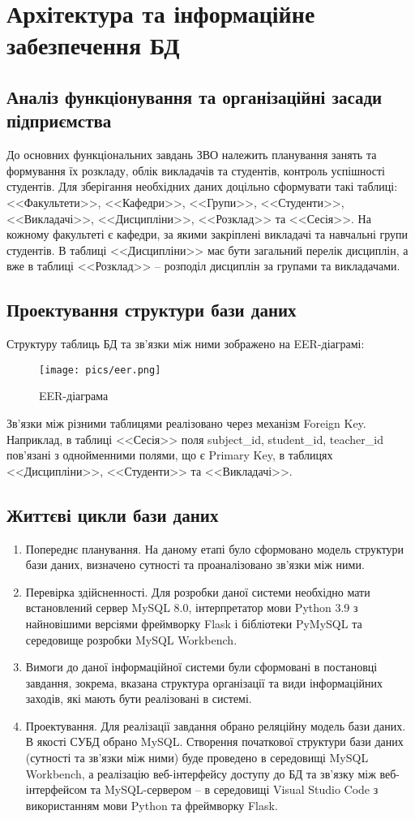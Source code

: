 \newpage
\chapter{Архітектура та інформаційне забезпечення БД}
\section{Аналіз функціонування та організаційні засади підприємства}
До основних функціональних завдань ЗВО належить планування занять та формування їх розкладу,
облік викладачів та студентів, контроль успішності студентів.
Для зберігання необхідних даних доцільно сформувати такі таблиці:
<<Факультети>>, <<Кафедри>>, <<Групи>>, <<Студенти>>, <<Викладачі>>, 
<<Дисципліни>>, <<Розклад>> та <<Сесія>>. На кожному факультеті є кафедри,
за якими закріплені викладачі та навчальні групи студентів. В таблиці <<Дисципліни>>
має бути загальний перелік дисциплін, а вже в таблиці <<Розклад>> -- розподіл
дисциплін за групами та викладачами.

\section{Проектування структури бази даних}
Структуру таблиць БД та зв'язки між ними зображено на EER-діаграмі:
\begin{figure}[h]
    \centering
    \texttt{[image: pics/eer.png]}
    \caption{EER-діаграма}
\end{figure}

Зв'язки між різними таблицями реалізовано через механізм Foreign Key.
Наприклад, в таблиці <<Сесія>> поля subject\_id, student\_id, teacher\_id 
пов'язані з однойменними полями, що є Primary Key, в таблицях <<Дисципліни>>, <<Студенти>> та <<Викладачі>>.

\section{Життєві цикли бази даних}
\begin{enumerate}
    \item Попереднє планування. На даному етапі було сформовано модель структури бази даних, визначено сутності та
    проаналізовано зв'язки між ними.
    \item Перевірка здійсненності. Для розробки даної системи необхідно мати встановлений сервер MySQL 8.0,
    інтерпретатор мови Python 3.9 з найновішими версіями фреймворку Flask і бібліотеки PyMySQL та
    середовище розробки MySQL Workbench. 
    \item Вимоги до даної інформаційної системи були сформовані в постановці завдання,
    зокрема, вказана структура організації та види інформаційних заходів, які мають бути реалізовані в системі.
    \item Проектування. Для реалізації завдання обрано реляційну модель бази даних. В якості СУБД обрано MySQL.
    Створення початкової структури бази даних (сутності та зв'язки між ними) буде проведено в середовищі MySQL Workbench,
    а реалізацію веб-інтерфейсу доступу до БД та зв'язку між веб-інтерфейсом та MySQL-сервером -- в середовищі Visual Studio Code
    з використанням мови Python та фреймворку Flask.
\end{enumerate}